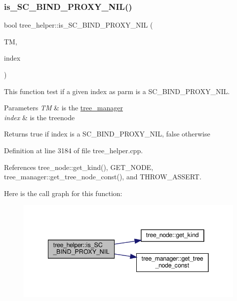 \subsubsection{\texorpdfstring{is\+\_\+\+S\+C\+\_\+\+B\+I\+N\+D\+\_\+\+P\+R\+O\+X\+Y\+\_\+\+N\+I\+L()}{is\_SC\_BIND\_PROXY\_NIL()}}
{\footnotesize\ttfamily bool tree\+\_\+helper\+::is\+\_\+\+S\+C\+\_\+\+B\+I\+N\+D\+\_\+\+P\+R\+O\+X\+Y\+\_\+\+N\+IL (\begin{DoxyParamCaption}\item[{const \hyperlink{tree__manager_8hpp_a792e3f1f892d7d997a8d8a4a12e39346}{tree\+\_\+manager\+Const\+Ref} \&}]{TM,  }\item[{const unsigned int}]{index }\end{DoxyParamCaption})\hspace{0.3cm}{\ttfamily [static]}}



This function test if a given index as parm is a S\+C\+\_\+\+B\+I\+N\+D\+\_\+\+P\+R\+O\+X\+Y\+\_\+\+N\+IL. 


\begin{DoxyParams}{Parameters}
{\em TM} & is the \hyperlink{classtree__manager}{tree\+\_\+manager} \\
\hline
{\em index} & is the treenode \\
\hline
\end{DoxyParams}
\begin{DoxyReturn}{Returns}
true if index is a S\+C\+\_\+\+B\+I\+N\+D\+\_\+\+P\+R\+O\+X\+Y\+\_\+\+N\+IL, false otherwise 
\end{DoxyReturn}


Definition at line 3184 of file tree\+\_\+helper.\+cpp.



References tree\+\_\+node\+::get\+\_\+kind(), G\+E\+T\+\_\+\+N\+O\+DE, tree\+\_\+manager\+::get\+\_\+tree\+\_\+node\+\_\+const(), and T\+H\+R\+O\+W\+\_\+\+A\+S\+S\+E\+RT.

Here is the call graph for this function\+:
\nopagebreak
\begin{figure}[H]
\begin{center}
\leavevmode
\includegraphics[width=341pt]{d7/d99/classtree__helper_a02343f3992681c9b6f614f1d8c3c4c2d_cgraph}
\end{center}
\end{figure}
\mbox{\label{classtree__helper_a2fb7f7a48d5444d13e98ec948eb44ce1}} 
